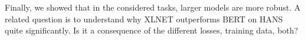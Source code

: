 Finally, we showed that in the considered tasks, larger models are more robust. A related question is to understand why XLNET outperforms BERT on HANS quite significantly. Is it a consequence of the different losses, training data, both?








